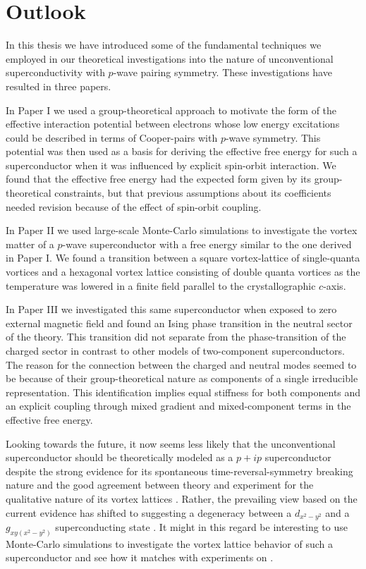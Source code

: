 \chapter{Outlook}\noindent
%
%
In this thesis we have introduced some of the fundamental techniques we employed in our theoretical investigations
into the nature of unconventional superconductivity with $p$-wave pairing symmetry. These investigations have resulted in three papers.

In Paper I we used a group-theoretical approach to
motivate the form of the effective interaction potential between electrons whose low energy excitations could be described
in terms of Cooper-pairs with $p$-wave symmetry. This potential was then used as a basis for deriving the effective free energy
for such a superconductor when it was influenced by explicit spin-orbit interaction. We found that the effective free energy
had the expected form given by its group-theoretical constraints, but that previous assumptions about its coefficients needed
revision because of the effect of spin-orbit coupling.

In Paper II we used large-scale Monte-Carlo simulations to investigate the vortex matter of a $p$-wave superconductor with a free
energy similar to the one derived in Paper I. We found a transition between a square vortex-lattice of single-quanta vortices
and a hexagonal vortex lattice consisting of double quanta vortices as the temperature was lowered in a finite field parallel
to the crystallographic $c$-axis.

In Paper III we investigated this same superconductor when exposed to zero external magnetic field and found an Ising phase transition
in the neutral sector of the theory. This transition did not separate from the phase-transition of the charged sector in contrast
to other models of two-component superconductors. The reason for the connection between the charged and neutral modes seemed to
be because of their group-theoretical nature as components of a single
irreducible representation. This identification implies equal stiffness for both components and an explicit coupling through mixed gradient
and mixed-component terms in the effective free energy.

Looking towards the future, it now seems less likely that the unconventional superconductor  should be theoretically
modeled as a $p+ip$ superconductor despite the strong evidence for its spontaneous time-reversal-symmetry breaking nature
\cite{Luke98,Xia06,Grinenko20} and the good
agreement between theory and experiment for the qualitative nature of its vortex lattices \cite{Ray14,AsleGaraud16}. Rather, the
prevailing view based on the current evidence has shifted to suggesting a degeneracy between a $d_{x^2-y^2}$ and a $g_{xy(x^2-y^2)}$ 
superconducting state \cite{Kivelson20,Ghosh21}. It might in this regard be interesting to use Monte-Carlo simulations to
investigate the vortex lattice behavior of such a superconductor and see how it matches with experiments on .

